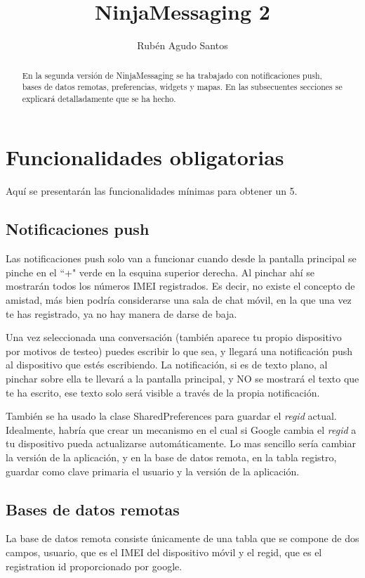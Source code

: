 \documentclass[]{article}
\title{NinjaMessaging 2}
\author{Rub\'en Agudo Santos}
\begin{document}
\maketitle

\begin{abstract}
En la segunda versi\'on de NinjaMessaging se ha trabajado con notificaciones push, bases de datos remotas, preferencias,
widgets y mapas. En las subsecuentes secciones se explicar\'a detalladamente que se ha hecho.
\end{abstract}

\section{Funcionalidades obligatorias}
Aqu\'i se presentar\'an las funcionalidades m\'inimas para obtener un 5.
\subsection{Notificaciones push}
Las notificaciones push solo van a funcionar cuando desde la pantalla principal se pinche en el ``+" verde en la esquina
superior derecha. Al pinchar ah\'i se mostrar\'an todos los n\'umeros IMEI registrados. Es decir, no existe el concepto de amistad,
m\'as bien podr\'ia considerarse una sala de chat m\'ovil, en la que una vez te has registrado, ya no hay manera de darse de baja.

Una vez seleccionada una conversaci\'on (tambi\'en aparece tu propio dispositivo por motivos de testeo) puedes escribir lo que
sea, y llegar\'a una notificaci\'on push al dispositivo que est\'es escribiendo. La notificaci\'on, si es de texto plano, al 
pinchar sobre ella te llevar\'a a la pantalla principal, y NO se mostrar\'a el texto que te ha escrito, ese texto solo ser\'a
visible a trav\'es de la propia notificaci\'on.

Tambi\'en se ha usado la clase SharedPreferences para guardar el \emph{regid} actual. Idealmente, habr\'ia que crear un mecanismo 
en el cual si Google cambia el \emph{regid} a tu dispositivo pueda actualizarse autom\'aticamente. Lo mas sencillo ser\'ia cambiar
la versi\'on de la aplicaci\'on, y en la base de datos remota, en la tabla registro, guardar como clave primaria el usuario y
la versi\'on de la aplicaci\'on.

\subsection{Bases de datos remotas}
La base de datos remota consiste \'unicamente de una tabla que se compone de dos campos, usuario, que es el IMEI del dispositivo
m\'ovil y el regid, que es el registration id proporcionado por google.
\end{document}
